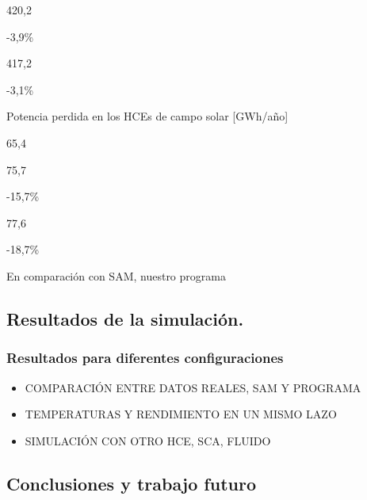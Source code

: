\documentclass[11pt]{article}
\makeatletter
\providecommand{\tightlist}{%
      \setlength{\itemsep}{0pt}\setlength{\parskip}{0pt}}
\newcommand{\boxspacing}{\kern\kvtcb@left@rule\kern\kvtcb@boxsep}
\newcommand{\prompt}[4]{
        \ttfamily\llap{{\color{#2}[#3]:\hspace{3pt}#4}}\vspace{-\baselineskip}
    }
\makeatother
\begin{document}
420,2

-3,9\%

417,2

-3,1\%

Potencia perdida en los HCEs de campo solar {[}GWh/año{]}

65,4

75,7

-15,7\%

77,6

-18,7\%

En comparación con SAM, nuestro programa

    \hypertarget{resultados-de-la-simulaciuxf3n.}{%
\subsection{Resultados de la
simulación.}\label{resultados-de-la-simulaciuxf3n.}}

\hypertarget{resultados-para-diferentes-configuraciones}{%
\subsubsection{Resultados para diferentes
configuraciones}\label{resultados-para-diferentes-configuraciones}}

\begin{itemize}
\tightlist
\item
  COMPARACIÓN ENTRE DATOS REALES, SAM Y PROGRAMA
\item
  TEMPERATURAS Y RENDIMIENTO EN UN MISMO LAZO
\item
  SIMULACIÓN CON OTRO HCE, SCA, FLUIDO
\end{itemize}

\hypertarget{conclusiones-y-trabajo-futuro}{%
\subsection{Conclusiones y trabajo
futuro}\label{conclusiones-y-trabajo-futuro}}

    

    \begin{tcolorbox}[breakable, size=fbox, boxrule=1pt, pad at break*=1mm,colback=cellbackground, colframe=cellborder]
\prompt{In}{incolor}{ }{\boxspacing}
\begin{Verbatim}[commandchars=\\\{\}]

\end{Verbatim}
\end{tcolorbox}


    
    
    
\end{document}
